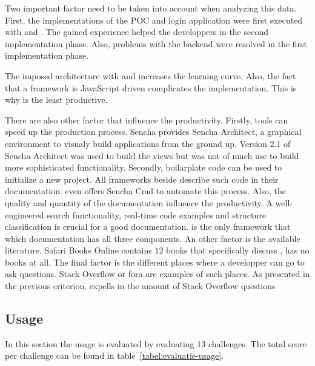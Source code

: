 \documentclass[a4paper]{artikel3}
\begin{document}
Two important factor need to be taken into account when analyzing this data.
First,  the implementations of the POC and login application were first executed with \jqm{} and \st{}.
The gained experience helped the developpers in the second implementation phase.
Also,  problems with the backend were resolved in the first implementation phase.

The imposed architecture with \st{} and \kendo{} increases the learning curve.
Also, the fact that a framework is JavaScript driven complicates the implementation.
This is why \st{} is the least productive.

There are also other factor that influence the productivity.
Firstly,  tools can speed up the production process.
Sencha provides Sencha Architect,  a graphical environment to visualy build applications from the ground up.
Version 2.1 of Sencha Architect was used to build the views but was not of much use to build more sophisticated functionality.
Secondly,  boilarplate code can be used to initialize a new project.
All frameworks beside \lungo{} describe such code in their documentation.
\st{} even offers Sencha Cmd to automate this process.
Also, the quality and quantity of the documentation influence the productivity.
A well-engineered search functionality,  real-time code examples and structure classification is crucial for a good documentation.
\kendo{} is the only framework that which documentation has all three components.  
An other factor is the available literature.
Safari Books Online contains $12$ books that specifically discuss \jqm{},  \lungo{} has no books at all.
The final factor is the different places where a developper can go to ask questions.
Stack Overflow or fora are examples of such places. %
As presented in the previous criterion,  \jqm{} expells in the amount of Stack Overflow questions


\subsection{Usage}
\label{sec:evaluation-usage}
In this section the usage is evaluated by evaluating 13 challenges.
The total score per challenge can be found in table~\ref{tabel:evaluatie-usage}.
\end{document}
